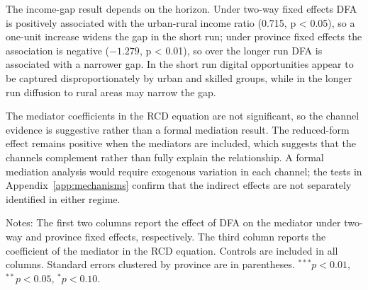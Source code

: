 The income-gap result depends on the horizon. Under two-way fixed effects DFA is positively associated with the urban-rural income ratio (0.715, p < 0.05), so a one-unit increase widens the gap in the short run; under province fixed effects the association is negative ($-1.279$, p < 0.01), so over the longer run DFA is associated with a narrower gap. In the short run digital opportunities appear to be captured disproportionately by urban and skilled groups, while in the longer run diffusion to rural areas may narrow the gap.

The mediator coefficients in the RCD equation are not significant, so the channel evidence is suggestive rather than a formal mediation result. The reduced-form effect remains positive when the mediators are included, which suggests that the channels complement rather than fully explain the relationship. A formal mediation analysis would require exogenous variation in each channel; the tests in Appendix~\ref{app:mechanisms} confirm that the indirect effects are not separately identified in either regime.

\begin{table}[H]
\caption{Channel regressions.}\label{tab:mechanisms}
\begin{threeparttable}
\small
\resizebox{\textwidth}{!}{}
\begin{tablenotes}
\small
\item Notes: The first two columns report the effect of DFA on the mediator under two-way and province fixed effects, respectively. The third column reports the coefficient of the mediator in the RCD equation. Controls are included in all columns. Standard errors clustered by province are in parentheses. $^{***}p<0.01$, $^{**}p<0.05$, $^{*}p<0.10$.
\end{tablenotes}
\end{threeparttable}
\end{table}
